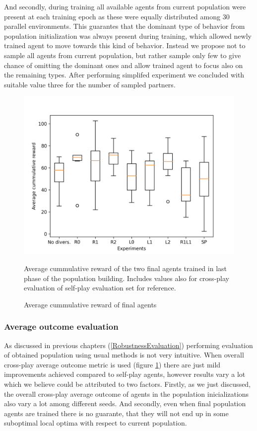 And secondly, during training all available agents from current population were present at each training epoch as these were equally distributed among 30 parallel environments.
This guarantes that the dominant type of behavior from population initialization was always present during training, which allowed newly trained agent to move towards this kind of behavior.
Instead we propose not to sample all agents from current population, but rather sample only few to give chance of omitting the dominant ones and allow trained agent to focus also on the remaining types.
After performing simplifed experiment we concluded with suitable value three for the number of sampled partners.  


\begin{figure}[!ht]
    \centering
    \includegraphics*[width=14cm]{../img/SimpleCnnExperimentsAvg.png}

    \caption{Average cummulative reward of final agents}
    \label{AvgCummulativeRewardEvaluated}
    \medskip
    \small 
    Average cummulative reward of the two final agents trained in last phase of the population building.
    Includes values also for cross-play evaluation of self-play evaluation set for reference. 

\end{figure}

\subsubsection{Average outcome evaluation}

As discussed in previous chapters (\ref{RobustnessEvaluation}) performing evaluation of obtained population using usual methods is not very intuitive. 
When overall cross-play average outcome metric is used (figure \ref{AvgCummulativeRewardEvaluated}) there are just mild improvements achieved compared to self-play agents, however results vary a lot which we believe could be attributed to two factors.
Firstly, as we just discussed, the overall cross-play average outcome of agents in the population inicializations also vary a lot among different seeds.
And secondly, even when final population agents are trained there is no guarante, that they will not end up in some suboptimal local optima with respect to current population.


